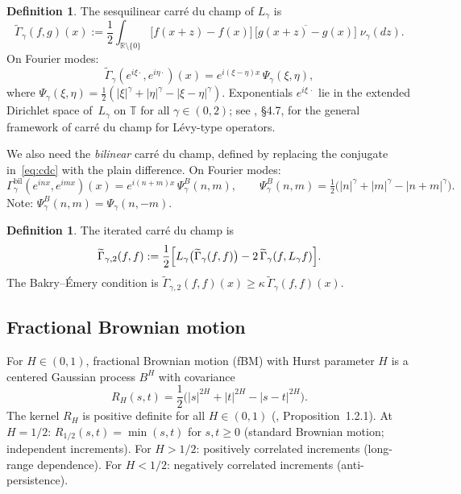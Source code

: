 \documentclass[11pt,a4paper]{article}
\theoremstyle{plain}
\theoremstyle{definition}
\newtheorem{definition}[theorem]{Definition}
\theoremstyle{remark}
\newcommand{\R}{\mathbb{R}}
\newcommand{\T}{\mathbb{T}}
\begin{document}
\begin{definition}\label{def:cdc}
The sesquilinear carr\'e du champ of $L_\gamma$ is
\begin{equation}\label{eq:cdc}
  \widetilde{\Gamma}_\gamma(f,g)(x)
  := \frac{1}{2} \int_{\R \setminus \{0\}}
  \bigl[f(x+z) - f(x)\bigr]\,
  \overline{\bigl[g(x+z) - g(x)\bigr]}\;
  \nu_\gamma(dz).
\end{equation}
On Fourier modes:
\begin{equation}\label{eq:psi-kernel}
  \widetilde{\Gamma}_\gamma(e^{i\xi\cdot}, e^{i\eta\cdot})(x)
  = e^{i(\xi-\eta)x}\,\Psi_\gamma(\xi,\eta),
\end{equation}
where $\Psi_\gamma(\xi,\eta)
= \tfrac{1}{2}(|\xi|^\gamma + |\eta|^\gamma - |\xi-\eta|^\gamma)$.
Exponentials $e^{i\xi\,\cdot}$ lie in the extended Dirichlet space
of~$L_\gamma$ on $\T$ for all $\gamma \in (0,2)$; see
\cite{BoettcherSchillingWang2013}, \S4.7, for the general framework
of carr\'e du champ for L\'evy-type operators.
\end{definition}

We also need the \emph{bilinear} carr\'e du champ, defined by replacing
the conjugate in~\eqref{eq:cdc} with the plain difference. On Fourier modes:
\begin{equation}\label{eq:psi-bilinear}
  \Gamma_\gamma^{\mathrm{bil}}(e^{inx}, e^{imx})(x)
  = e^{i(n+m)x}\,\Psi_\gamma^B(n,m),
  \qquad
  \Psi_\gamma^B(n,m) = \tfrac{1}{2}\bigl(|n|^\gamma + |m|^\gamma
  - |n+m|^\gamma\bigr).
\end{equation}
Note: $\Psi_\gamma^B(n,m) = \Psi_\gamma(n,-m)$.

\begin{definition}\label{def:gamma2}
The iterated carr\'e du champ is
\begin{equation}\label{eq:gamma2-def}
  \widetilde{\Gamma}_{\gamma,2}(f,f)
  := \frac{1}{2}\Bigl[
    L_\gamma\bigl(\widetilde{\Gamma}_\gamma(f,f)\bigr)
    - 2\,\widetilde{\Gamma}_\gamma(f, L_\gamma f)
  \Bigr].
\end{equation}
The Bakry--\'Emery condition is
$\widetilde{\Gamma}_{\gamma,2}(f,f)(x) \geq \kappa\,
\widetilde{\Gamma}_\gamma(f,f)(x)$.
\end{definition}


\subsection{Fractional Brownian motion}

For $H \in (0,1)$, fractional Brownian motion (fBM) with Hurst
parameter $H$ is a centered Gaussian process $B^H$ with covariance
\begin{equation}\label{eq:fbm-cov}
  R_H(s,t)
  = \frac{1}{2}\bigl(|s|^{2H} + |t|^{2H} - |s-t|^{2H}\bigr).
\end{equation}
The kernel $R_H$ is positive definite for all $H \in (0,1)$
(\cite{Mishura2008}, Proposition~1.2.1).
At $H = 1/2$: $R_{1/2}(s,t) = \min(s,t)$ for $s,t \geq 0$
(standard Brownian motion; independent increments).
For $H > 1/2$: positively correlated increments (long-range dependence).
For $H < 1/2$: negatively correlated increments (anti-persistence).
\end{document}
